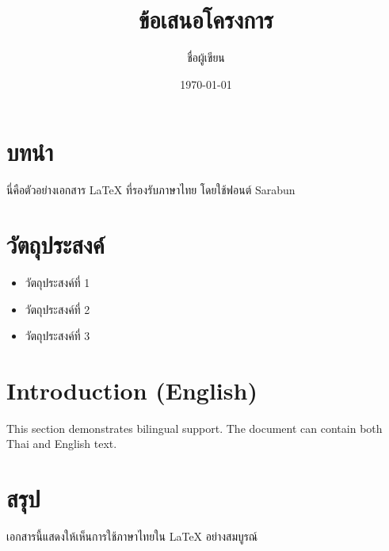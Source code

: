 \documentclass{article}
\title{ข้อเสนอโครงการ}
\author{ชื่อผู้เขียน}
\date{\today}
\begin{document}
\maketitle

\section{บทนำ}
นี่คือตัวอย่างเอกสาร LaTeX ที่รองรับภาษาไทย โดยใช้ฟอนต์ Sarabun

\section{วัตถุประสงค์}
\begin{itemize}
    \item วัตถุประสงค์ที่ 1
    \item วัตถุประสงค์ที่ 2
    \item วัตถุประสงค์ที่ 3
\end{itemize}

\section{Introduction (English)}
\begin{english}
This section demonstrates bilingual support. The document can contain both Thai and English text.
\end{english}

\section{สรุป}
เอกสารนี้แสดงให้เห็นการใช้ภาษาไทยใน LaTeX อย่างสมบูรณ์
\end{document}
